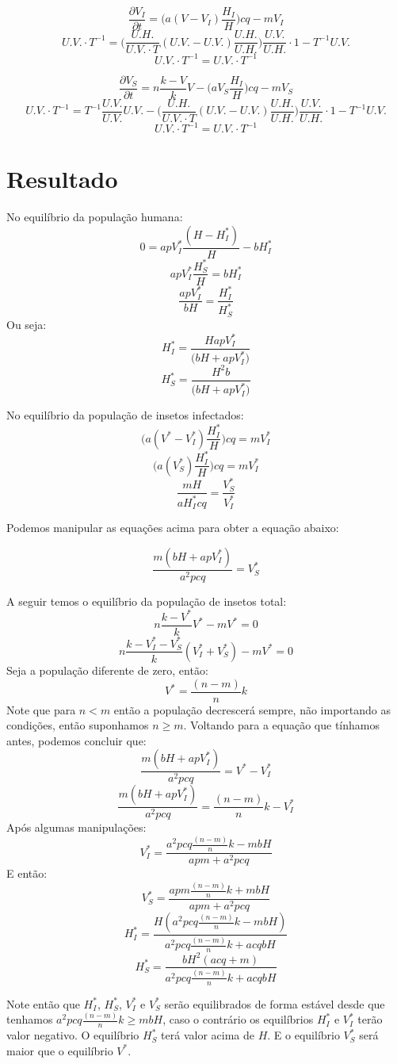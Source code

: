 \documentclass[
	12pt,				%
	openright,			%
	twoside,			%
	a4paper,			%
	english,			%
	french,				%
	spanish,			%
	brazil				%
	]{abntex2}
\begin{document}
$$ \frac{\partial V_I}{\partial t}= \Big(a(V-V_I)\frac{H_I}{H}\Big)cq-m V_I$$
$$U.V.\cdot T^{-1}=\Big(\frac{U.H.}{U.V.\cdot T} (U.V.-U.V.)\frac{U.H.}{U.H.}\Big)\frac{U.V.}{U.H.}\cdot 1 - T^{-1}U.V.$$
$$U.V.\cdot T^{-1}=U.V.\cdot T^{-1}$$


$$ \frac{\partial V_S}{\partial t}= n\frac{k-V}{k}V-\Big(aV_S\frac{H_I}{H}\Big)cq-m V_S$$
$$U.V.\cdot T^{-1} = T^{-1}\frac{U.V.}{U.V.}U.V. -  \Big(\frac{U.H.}{U.V.\cdot T} (U.V.-U.V.)\frac{U.H.}{U.H.}\Big)\frac{U.V.}{U.H.}\cdot 1 - T^{-1}U.V.$$
$$U.V.\cdot T^{-1}=U.V.\cdot T^{-1}$$

\chapter*[Resultado]{Resultado}
No equilíbrio da população humana:
$$ 0= a pV_I^\ast\frac{(H-H_I^\ast)}{H}- b H_I^\ast$$
$$a pV_I^\ast\frac{H_S^\ast}{H}= b H_I^\ast$$
$$\frac{a pV_I^\ast}{bH}= \frac{H_I^\ast}{H_S^\ast}$$
Ou seja:
$$H_I^\ast = \frac{HapV_I^\ast}{\Big(bH+apV_I^\ast\Big)}$$
$$H_S^\ast = \frac{H^2b}{\Big(bH+apV_I^\ast\Big)}$$

No equilíbrio da população de insetos infectados:
$$\Big(a(V^\ast-V_I^\ast)\frac{H_I^\ast}{H}\Big)cq=m V_I^\ast$$
$$\Big(a(V_S^\ast)\frac{H_I^\ast}{H}\Big)cq=m V_I^\ast$$
$$\frac{mH}{aH_I^\ast cq}=\frac{V_S^\ast}{V_I^\ast}$$

Podemos manipular as equações acima para obter a equação abaixo:

$$\frac{m(bH + apV^\ast_I)}{a^2p cq}=V_S^\ast$$

A seguir temos o equilíbrio da população de insetos total:
$$n\frac{k-V^\ast}{k}V^\ast-m V^\ast=0$$
$$n\frac{k-V^\ast_I - V^\ast_S}{k}(V^\ast_I + V^\ast_S)- m V^\ast=0$$
Seja a população diferente de zero, então:
$$V^\ast=\frac{(n-m)}{n}k$$
Note que para $n<m$ então a população decrescerá sempre, não importando as condições, então suponhamos $n\ge m.$
Voltando para a equação que tínhamos antes, podemos concluir que:
$$\frac{m(bH + apV^\ast_I)}{a^2p cq}=V^\ast - V_I^\ast$$
$$\frac{m(bH + apV^\ast_I)}{a^2p cq}=\frac{(n-m)}{n}k - V_I^\ast$$
Após algumas manipulações:
$$V^\ast_I=\frac{a^2p cq\frac{(n-m)}{n}k-mbH}{apm+a^2p cq}$$
E então:
$$V^\ast_S=\frac{ap m\frac{(n-m)}{n}k+mbH}{apm+a^2p cq}$$
$$H_I^\ast = \frac{H(a^2pcq\frac{(n-m)}{n}k-mbH)}{a^2pcq\frac{(n-m)}{n}k+acqbH}$$
$$H_S^\ast = \frac{bH^2(acq+m)}{a^2pcq\frac{(n-m)}{n}k+acqbH}$$

Note então que $H^\ast_I$, $H^\ast_S$, $V_I^\ast$ e $V_S^\ast$ serão equilibrados de forma estável desde que tenhamos $a^2p cq\frac{(n-m)}{n}k\ge mbH$, caso o contrário os equilíbrios $H^\ast_I$ e $V^\ast_I$ terão valor negativo. O equilíbrio $H^\ast_S$ terá valor acima de $H$. E o equilíbrio $V_S^\ast$ será maior que o equilíbrio $V^\ast.$\\
\end{document}
